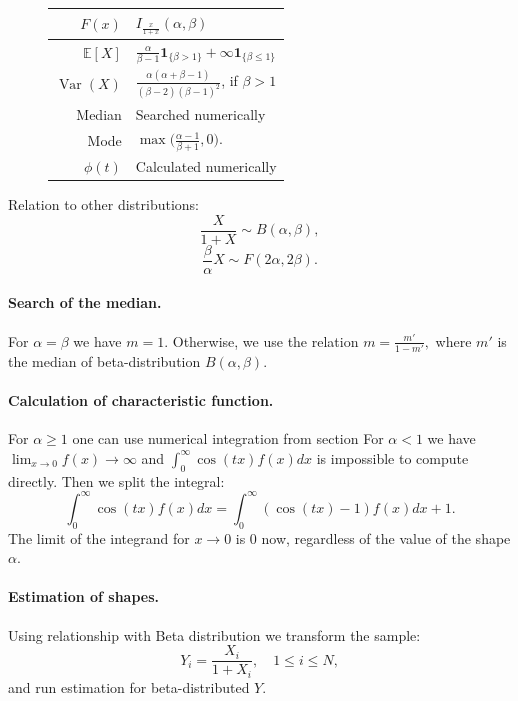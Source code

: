 \documentclass[a4paper,11pt]{article}
\theoremstyle{plain}
\theoremstyle{definition}
\newcommand{\ME}{\mathbb{E}}
\newcommand{\Var}{\operatorname{Var}}
\begin{document}
\begin{figure}[!htb]
\begin{minipage}{0.4\textwidth}
\begin{tabular}{| r | l |}
				\hline
				$F(x)$ & $I_{\frac{x}{1+x}}(\alpha, \beta)$\\
				\hline
				$\ME[X]$ & $ \frac{\alpha}{\beta - 1}\mathbf{1}_{\{\beta > 1 \} } + \infty \mathbf{1}_{\{\beta \leq 1\} } $ \\
				\hline
				$\Var(X)$ & $\frac{ \alpha (\alpha +\beta - 1) }{ (\beta-2)(\beta-1)^2 }$, if $\beta > 1$ \\
				\hline
				Median & Searched numerically \\
				\hline
				Mode & $\max\big( \frac{\alpha-1}{\beta+1}, 0 \big)$. \\
				\hline
				$\phi(t)$ & Calculated numerically \\
				\hline
			\end{tabular}
		\end{minipage}
	\end{figure}
	Relation to other distributions:
	\[\frac{X}{1+X} \sim B(\alpha, \beta),\]
	\[
	\frac{\beta}{\alpha}X \sim F(2\alpha, 2\beta ).
	\]
	
	\paragraph{Search of the median.} For $\alpha = \beta$ we have $m=1$. Otherwise, we use the relation
	$m = \frac{m'}{1-m'},$
	where $m'$ is the median of beta-distribution $B(\alpha, \beta)$.
	
	\paragraph{Calculation of characteristic function.} For $\alpha \geq 1$ one can use numerical integration from section %
	For $\alpha < 1$ we have $\lim_{x \rightarrow 0} f(x) \rightarrow \infty$ and $\int_{0}^{\infty} \cos(tx)f(x) dx$ is impossible to compute directly. Then we split the integral:
	\[
	\int_{0}^{\infty} \cos(tx)f(x) dx = \int_{0}^{\infty}(\cos(tx)-1) f(x) dx + 1.
	\]
	The limit of the integrand for $x \rightarrow 0$ is $0$ now, regardless of the value of the shape $\alpha$.
	
	\paragraph{Estimation of shapes.} Using relationship with Beta distribution we transform the sample:
	\[ Y_i = \frac{X_i}{1+X_i}, \quad 1 \leq i \leq N, \]
	and run estimation for beta-distributed $Y$.

	\pagebreak
\end{document}
